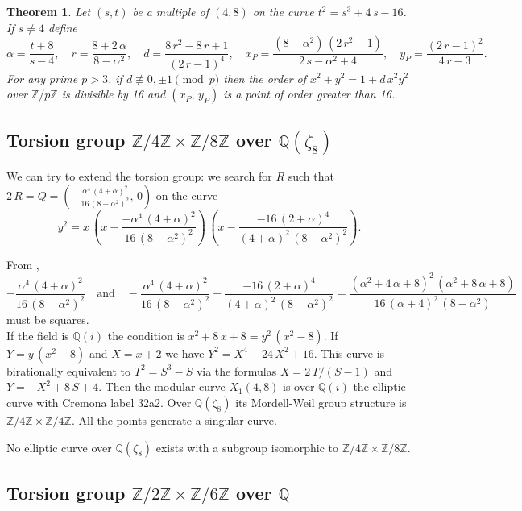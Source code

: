 \documentclass[a4paper, 11pt, pdftex]{report}
\theoremstyle{plain}
\newtheorem{theorem}{Theorem}[chapter]
\theoremstyle{definition}
\begin{document}
\begin{theorem} \label{Th_2x8}
Let $(s, t)$ be a multiple of $(4, 8)$ on the curve $t^2 = s^3 + 4\,s - 16$. If
$s \neq 4$  define
$$\alpha = \frac{t + 8}{s - 4},\quad r = \frac{8 + 2\,\alpha}{8 - \alpha^2},\quad
d = \frac{8\,r^2 - 8\,r + 1}{(2\,r - 1)^4},\quad
x_P = \frac{(8 - \alpha^2)\,(2\,r^2 - 1)}{2\,s - \alpha^2 + 4},\quad
y_P = \frac{(2\,r - 1)^2}{4\,r - 3}.$$
For any prime $p > 3$, if $d \not\equiv 0, \pm1 \pmod p$ then the order of
$x^2 + y^2 = 1 + d\,x^2y^2$ over $\mathbb{Z}/p\mathbb{Z}$ is divisible by 16
and $(x_P,\,y_P)$ is a point of order greater than 16.
\end{theorem}

\subsection{Torsion group $\mathbb{Z}/4\mathbb{Z} \times \mathbb{Z}/8\mathbb{Z}$ over $\mathbb{Q}(\zeta_8)$}

We can try to extend the torsion group: we search for $R$ such that
$2\,R = Q = \left(-\frac{\alpha^4\,(4 + \alpha)^2}{16\,(8 - \alpha^2)^2},\, 0\right)$
on the curve
$$y^2 = x\, \left(x - \frac{-\alpha^4\,(4 + \alpha)^2}{16\,(8 - \alpha^2)^2} \right)\,
 \left(x - \frac{-16\,(2 + \alpha)^4}{(4 + \alpha)^2\,(8 - \alpha^2)^2} \right).$$

From \cite[Theorem 4.2]{Knapp1},
$$-\frac{\alpha^4\,(4 + \alpha)^2}{16\,(8 - \alpha^2)^2} \quad \text{and} \quad
-\frac{\alpha^4\,(4 + \alpha)^2}{16\,(8 - \alpha^2)^2}
 - \frac{-16\,(2 + \alpha)^4}{(4 + \alpha)^2\,(8 - \alpha^2)^2}
 = \frac{(\alpha^2 + 4\,\alpha + 8)^2\,(\alpha^2 + 8\,\alpha + 8)}{16\,(\alpha+4)^2\,(8 - \alpha^2)}$$
must be squares.\\
If the field is $\mathbb{Q}(i)$ the condition is $x^2 + 8\,x + 8 = y^2\,(x^2 - 8)$.
If $Y = y\,(x^2 - 8)$ and $X = x + 2$ we have $Y^2 = X^4 - 24\,X^2 + 16$. This curve is
birationally equivalent to $T^2 = S^3 - S$ via the formulas $X = 2\,T / (S - 1)$ and
$Y = -X^2 + 8\,S + 4$. Then the modular curve $X_1(4, 8)$ is over $\mathbb{Q}(i)$
the elliptic curve with Cremona label 32a2. Over $\mathbb{Q}(\zeta_8)$ its Mordell-Weil group
structure is $\mathbb{Z}/4\mathbb{Z} \times \mathbb{Z}/4\mathbb{Z}$. All the points generate
a singular curve.

No elliptic curve over $\mathbb{Q}(\zeta_8)$ exists with a subgroup isomorphic to
$\mathbb{Z}/4\mathbb{Z} \times \mathbb{Z}/8\mathbb{Z}$.

\subsection{Torsion group $\mathbb{Z}/2\mathbb{Z} \times \mathbb{Z}/6\mathbb{Z}$ over $\mathbb{Q}$}
\end{document}
